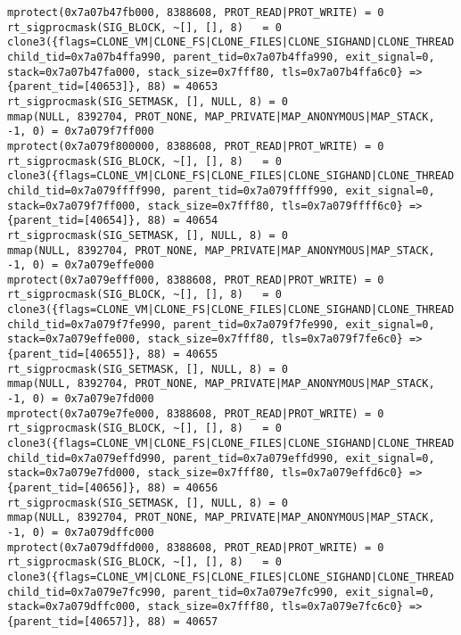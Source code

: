 \begin{verbatim}
mprotect(0x7a07b47fb000, 8388608, PROT_READ|PROT_WRITE) = 0
rt_sigprocmask(SIG_BLOCK, ~[], [], 8)   = 0
clone3({flags=CLONE_VM|CLONE_FS|CLONE_FILES|CLONE_SIGHAND|CLONE_THREAD|CLONE_SYSVSEM|CLONE_SETTLS|CLONE_PARENT_SETTID|CLONE_CHILD_CLEARTID, child_tid=0x7a07b4ffa990, parent_tid=0x7a07b4ffa990, exit_signal=0, stack=0x7a07b47fa000, stack_size=0x7fff80, tls=0x7a07b4ffa6c0} => {parent_tid=[40653]}, 88) = 40653
rt_sigprocmask(SIG_SETMASK, [], NULL, 8) = 0
mmap(NULL, 8392704, PROT_NONE, MAP_PRIVATE|MAP_ANONYMOUS|MAP_STACK, -1, 0) = 0x7a079f7ff000
mprotect(0x7a079f800000, 8388608, PROT_READ|PROT_WRITE) = 0
rt_sigprocmask(SIG_BLOCK, ~[], [], 8)   = 0
clone3({flags=CLONE_VM|CLONE_FS|CLONE_FILES|CLONE_SIGHAND|CLONE_THREAD|CLONE_SYSVSEM|CLONE_SETTLS|CLONE_PARENT_SETTID|CLONE_CHILD_CLEARTID, child_tid=0x7a079ffff990, parent_tid=0x7a079ffff990, exit_signal=0, stack=0x7a079f7ff000, stack_size=0x7fff80, tls=0x7a079ffff6c0} => {parent_tid=[40654]}, 88) = 40654
rt_sigprocmask(SIG_SETMASK, [], NULL, 8) = 0
mmap(NULL, 8392704, PROT_NONE, MAP_PRIVATE|MAP_ANONYMOUS|MAP_STACK, -1, 0) = 0x7a079effe000
mprotect(0x7a079efff000, 8388608, PROT_READ|PROT_WRITE) = 0
rt_sigprocmask(SIG_BLOCK, ~[], [], 8)   = 0
clone3({flags=CLONE_VM|CLONE_FS|CLONE_FILES|CLONE_SIGHAND|CLONE_THREAD|CLONE_SYSVSEM|CLONE_SETTLS|CLONE_PARENT_SETTID|CLONE_CHILD_CLEARTID, child_tid=0x7a079f7fe990, parent_tid=0x7a079f7fe990, exit_signal=0, stack=0x7a079effe000, stack_size=0x7fff80, tls=0x7a079f7fe6c0} => {parent_tid=[40655]}, 88) = 40655
rt_sigprocmask(SIG_SETMASK, [], NULL, 8) = 0
mmap(NULL, 8392704, PROT_NONE, MAP_PRIVATE|MAP_ANONYMOUS|MAP_STACK, -1, 0) = 0x7a079e7fd000
mprotect(0x7a079e7fe000, 8388608, PROT_READ|PROT_WRITE) = 0
rt_sigprocmask(SIG_BLOCK, ~[], [], 8)   = 0
clone3({flags=CLONE_VM|CLONE_FS|CLONE_FILES|CLONE_SIGHAND|CLONE_THREAD|CLONE_SYSVSEM|CLONE_SETTLS|CLONE_PARENT_SETTID|CLONE_CHILD_CLEARTID, child_tid=0x7a079effd990, parent_tid=0x7a079effd990, exit_signal=0, stack=0x7a079e7fd000, stack_size=0x7fff80, tls=0x7a079effd6c0} => {parent_tid=[40656]}, 88) = 40656
rt_sigprocmask(SIG_SETMASK, [], NULL, 8) = 0
mmap(NULL, 8392704, PROT_NONE, MAP_PRIVATE|MAP_ANONYMOUS|MAP_STACK, -1, 0) = 0x7a079dffc000
mprotect(0x7a079dffd000, 8388608, PROT_READ|PROT_WRITE) = 0
rt_sigprocmask(SIG_BLOCK, ~[], [], 8)   = 0
clone3({flags=CLONE_VM|CLONE_FS|CLONE_FILES|CLONE_SIGHAND|CLONE_THREAD|CLONE_SYSVSEM|CLONE_SETTLS|CLONE_PARENT_SETTID|CLONE_CHILD_CLEARTID, child_tid=0x7a079e7fc990, parent_tid=0x7a079e7fc990, exit_signal=0, stack=0x7a079dffc000, stack_size=0x7fff80, tls=0x7a079e7fc6c0} => {parent_tid=[40657]}, 88) = 40657

\end{verbatim}
